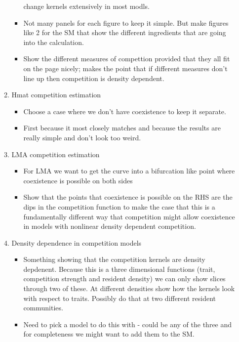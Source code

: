 \documentclass[a4paper,11pt]{article}
\begin{document}
\begin{itemize}
\begin{enumerate}
\begin{itemize}
    change kernels extensively in most modls.
  \item Not many panels for each figure to keep it simple.  But make
    figures like 2 for the SM that show the different ingredients that
    are going into the calculation.
  \item Show the different measures of compettion provided that they
    all fit on the page nicely; \citet{Abrams-2008} makes the point
    that if different measures don't line up then competition is
    density dependent.
  \end{itemize}
\item Hmat competition estimation
  \begin{itemize}
  \item Choose a case where we don't have coexistence to keep it
    separate.
  \item First because it most closely matches \citet{Kisdi-1999} and
    because the results are really simple and don't look too weird.
  \end{itemize}
\item LMA competition estimation
  \begin{itemize}
  \item For LMA we want to get the curve into a bifurcation like point
    where coexistence is possible on both sides
  \item Show that the points that coexistence is possible on the RHS
    are the dips in the competition function to make the case that
    this is a fundamentally different way that competition might allow
    coexistence in models with nonlinear density dependent
    competition.
  \end{itemize}
\item Density dependence in competition models
  \begin{itemize}
  \item Something showing that the competition kernels are density
    depdenent.  Because this is a three dimensional functions (trait,
    competition strength and resident density) we can only show slices
    through two of these.  At different densities show how the
    kernels look with respect to traits.  Possibly do that at two
    different resident communities.
  \item Need to pick a model to do this with - could be any of the
    three and for completeness we might want to add them to the SM.
  \end{itemize}
\end{enumerate}


\end{itemize}
\end{document}
